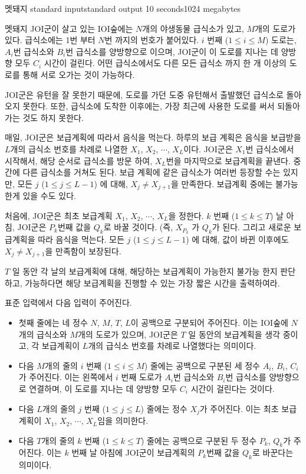 \begin{problem}{멧돼지}
	{standard input}{standard output}
	{10 seconds}{1024 megabytes}{}
	
	멧돼지 JOI군이 살고 있는 IOI숲에는 $N$개의 야생동물 급식소가 있고, $M$개의 도로가 있다. 급식소에는 1번 부터 $N$번 까지의 번호가 붙어있다. $i$ 번째 ($1 \le i \le M$) 도로는, $A_i$번 급식소와 $B_i$번 급식소를 양방향으로 이으며, JOI군이 이 도로를 지나는 데 양방향 모두 $C_i$ 시간이 걸린다. 어떤 급식소에서도 다른 모든 급식소 까지 한 개 이상의 도로를 통해 서로 오가는 것이 가능하다.
	
	JOI군은 유턴을 잘 못한기 때문에, 도로를 가던 도중 유턴해서 출발했던 급식소로 돌아오지 못한다. 또한, 급식소에 도착한 이후에는, 가장 최근에 사용한 도로를 써서 되돌아가는 것도 하지 못한다.
	
	매일, JOI군은 보급계획에 따라서 음식을 먹는다. 하루의 보급 계획은 음식을 보급받을 $L$개의 급식소 번호를 차례로 나열한 $X_1$, $X_2$, $\cdots$, $X_L$이다. JOI군은 $X_1$번 급식소에서 시작해서, 해당 순서로 급식소를 방문 하여, $X_L$번을 마지막으로 보급계획을 끝낸다. 중간에 다른 급식소를 거쳐도 된다. 보급 계획에 같은 급식소가 여러번 등장할 수는 있지만, 모든 $j$ ($1 \le j \le L-1$) 에 대해, $X_j \ne X_{j+1}$을 만족한다. 보급계획 중에는 불가능 한게 있을 수도 있다.
	
	처음에, JOI군은 최초 보급계획 $X_1$, $X_2$, $\cdots$, $X_L$을 정한다. $k$ 번째 ($1 \le k \le T$) 날 아침, JOI군은 $P_k$번째 값을 $Q_k$로 바꿀 것이다. (즉, $X_{P_k}$ 가 $Q_k$가 된다. 그리고 새로운 보급계획을 따라 음식을 먹는다. 모든 $j$ ($1 \le j \le L-1$) 에 대해, 값이 바뀐 이후에도 $X_j \ne X_{j+1}$을 만족함이 보장된다.
	
	$T$ 일 동안 각 날의 보급계획에 대해, 해당하는 보급계획이 가능한지 불가능 한지 판단하고, 가능하다면 해당 보급계획을 진행할 수 있는 가장 짧은 시간을 출력하여라.
	
	\InputFile
	
	표준 입력에서 다음 입력이 주어진다.
	
	\begin{itemize}
		\item 첫째 줄에는 네 정수 $N$, $M$, $T$, $L$이 공백으로 구분되어 주어진다. 이는 IOI숲에 $N$개의 급식소와 $M$개의 도로가 있으며, JOI군은 $T$ 일 동안의 보급계획을 생각 중이고, 각 보급계획이 $L$개의 급식소 번호를 차례로 나열했다는 의미이다.
		\item 다음 $M$개의 줄의 $i$ 번째 ($1 \le i \le M$) 줄에는 공백으로 구분된 세 정수 $A_i$, $B_i$, $C_i$가 주어진다. 이는 왼쪽에서 $i$ 번째 도로가 $A_i$번 급식소와 $B_i$번 급식소를 양방향으로 연결하며, 이 도로를 지나는 데 양방향 모두 $C_i$ 시간이 걸린다는 것이다.
		\item 다음 $L$개의 줄의 $j$ 번째 ($1 \le j \le L$) 줄에는 정수 $X_j$가 주어진다. 이는 최초 보급계획이 $X_1$, $X_2$, $\cdots$, $X_L$임을 의미한다.
		\item 다음 $T$개의 줄의 $k$ 번째 ($1 \le k \le T$) 줄에는 공백으로 구분된 두 정수 $P_k$, $Q_k$가 주어진다. 이는 $k$ 번째 날 아침에 JOI군이 보급계획의 $P_k$번째 값을 $Q_k$로 바꾼다는 의미이다.
	\end{itemize}
	

\end{problem}
